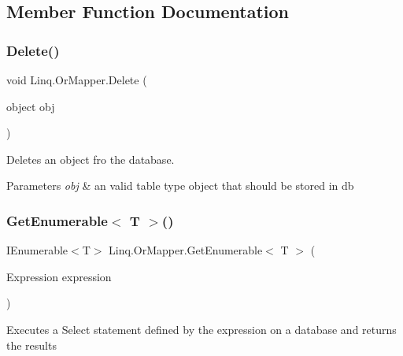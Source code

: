 \subsection{Member Function Documentation}
\mbox{\label{class_linq_1_1_or_mapper_a0a5f2100a6da15713a55ed3d972b8434}} 
\subsubsection{\texorpdfstring{Delete()}{Delete()}}
{\footnotesize\ttfamily void Linq.\+Or\+Mapper.\+Delete (\begin{DoxyParamCaption}\item[{object}]{obj }\end{DoxyParamCaption})\hspace{0.3cm}{\ttfamily [inline]}}



Deletes an object fro the database. 


\begin{DoxyParams}{Parameters}
{\em obj} & an valid table type object that should be stored in db\\
\hline
\end{DoxyParams}
\mbox{\label{class_linq_1_1_or_mapper_a1bdf8dd049f5bbe6f4b89c22b729f4fd}} 
\subsubsection{\texorpdfstring{Get\+Enumerable$<$ T $>$()}{GetEnumerable< T >()}}
{\footnotesize\ttfamily I\+Enumerable$<$T$>$ Linq.\+Or\+Mapper.\+Get\+Enumerable$<$ T $>$ (\begin{DoxyParamCaption}\item[{Expression}]{expression }\end{DoxyParamCaption})\hspace{0.3cm}{\ttfamily [inline]}}



Executes a Select statement defined by the expression on a database and returns the results 


